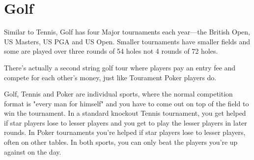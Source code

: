 \section{Golf}

Similar to Tennis, Golf has four Major tournaments each
year---the British Open, US Masters, US PGA and US Open. Smaller
tournaments have smaller fields and some are played over
three rounds of 54 holes not 4 rounds of 72 holes.

There's actually a second string golf tour where players pay an
entry fee and compete for each other's money, just like
Tourament Poker players do.

Golf, Tennis and Poker are individual sports, where
the normal competition format is "every man for himself" and
you have to come out on top of the field to win the tournament.
In a standard knockout Tennis tournament, you get helped
if star players lose to lesser players and you get to play the
lesser players in later rounds. In Poker tournaments you're
helped if star players lose to lesser players, often on other
tables. In both sports, you can only beat the players you're
up against on the day.
